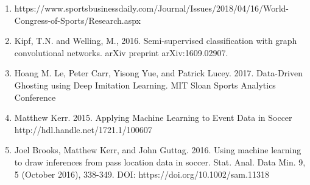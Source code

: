 \begin{enumerate}

\item https://www.sportsbusinessdaily.com/Journal/Issues/2018/04/16/World-Congress-of-Sports/Research.aspx 

\item Kipf, T.N. and Welling, M., 2016. Semi-supervised classification with graph convolutional networks. arXiv preprint         arXiv:1609.02907.

\item Hoang M. Le, Peter Carr, Yisong Yue, and Patrick Lucey. 2017. Data-Driven Ghosting using Deep Imitation Learning. MIT Sloan Sports Analytics Conference

\item Matthew Kerr. 2015. Applying Machine Learning to Event Data in Soccer    http://hdl.handle.net/1721.1/100607

\item Joel Brooks, Matthew Kerr, and John Guttag. 2016. Using machine learning to draw inferences from pass location data in soccer. Stat. Anal. Data Min. 9, 5 (October 2016), 338-349. DOI: https://doi.org/10.1002/sam.11318 


\end{enumerate}
